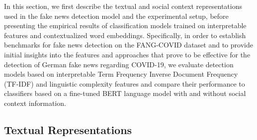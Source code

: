 \documentclass[11pt]{article}
\begin{document}
In this section, we first describe the textual and social context representations used in the fake news detection model and the experimental setup, before presenting the empirical results of classification models trained on interpretable features and contextualized word embeddings. Specifically, in order to establish benchmarks for fake news detection on the FANG-COVID dataset and to provide initial insights into the features and approaches that prove to be effective for the detection of German fake news regarding COVID-19, we evaluate detection models based on interpretable Term Frequency Inverse Document Frequency (TF-IDF) and linguistic complexity features and compare their performance to classifiers based on a fine-tuned BERT language model with and without social context information.

\subsection{Textual Representations}
\end{document}
